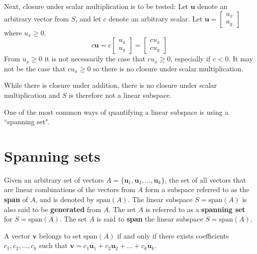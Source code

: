 \documentclass{article}
\begin{document}
\begin{itemize}
Next, closure under scalar multiplication is to be tested:
Let \(\mathbf{u}\) denote an arbitrary vector from \(S\), and let \(c\) denote an arbitrary scalar. Let \(\mathbf{u} = \begin{bmatrix} u_x \\ u_y \end{bmatrix}\) where \(u_x \geq 0\). 
\[c\mathbf{u} = c\begin{bmatrix} u_x \\ u_y \end{bmatrix} = \begin{bmatrix} c u_x \\ c u_y \end{bmatrix}\] 
From \(u_x \geq 0\) it is not necessarily the case that \(c u_x \geq 0\), especially if \(c < 0\). It may not be the case that \(c u_x \geq 0\) so there is no closure under scalar multiplication. 

While there is closure under addition, there is no closure under scalar multiplication and \(S\) is therefore not a linear subspace.
\end{itemize}

One of the most common ways of quantifying a linear subspace is using a ``spanning set". 



\section*{Spanning sets}

Given an arbitrary set of vectors \(A = \{\mathbf{u}_1, \mathbf{u}_2, ..., \mathbf{u}_k\}\), the set of all vectors that are linear combinations of the vectors from \(A\) form a subspace referred to as the {\bf span} of \(A\), and is denoted by \(\text{span}(A)\). The linear subspace \(S = \text{span}(A)\) is also said to be {\bf generated} from \(A\). The set \(A\) is referred to as a {\bf spanning set} for \(S = \text{span}(A)\). The set \(A\) is said to {\bf span} the linear subspace \(S = \text{span}(A)\).  

A vector \(\mathbf{v}\) belongs to set \(\text{span}(A)\) if and only if there exists coefficients \(c_1, c_2, ..., c_k\) such that \(\mathbf{v} = c_1\mathbf{u}_1 + c_2\mathbf{u}_2 + ... + c_k\mathbf{u}_k\).  

\end{document}
